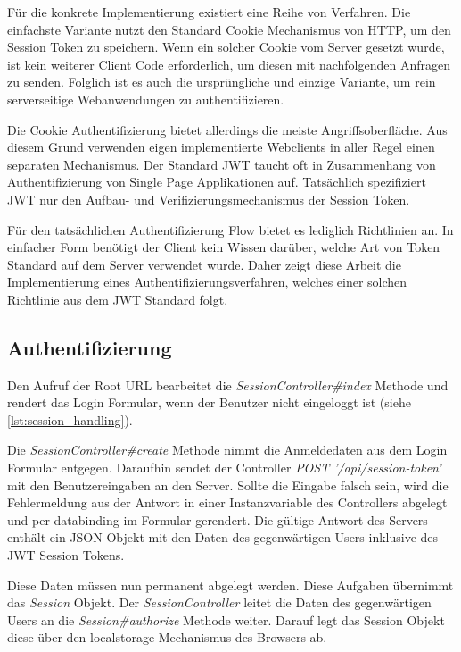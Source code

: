 Für die konkrete Implementierung existiert eine Reihe von Verfahren. Die einfachste Variante nutzt den Standard Cookie Mechanismus von HTTP, um den Session Token zu speichern. Wenn ein solcher Cookie vom Server gesetzt wurde, ist kein weiterer Client Code erforderlich, um diesen mit nachfolgenden Anfragen zu senden. Folglich ist es auch die ursprüngliche und einzige Variante, um rein serverseitige Webanwendungen zu authentifizieren.

Die Cookie Authentifizierung bietet allerdings die meiste Angriffsoberfläche. Aus diesem Grund verwenden eigen implementierte Webclients in aller Regel einen separaten Mechanismus. Der Standard JWT taucht oft in Zusammenhang von Authentifizierung von Single Page Applikationen auf. Tatsächlich spezifiziert JWT nur den Aufbau- und Verifizierungsmechanismus der Session Token. 

Für den tatsächlichen Authentifizierung Flow bietet es lediglich Richtlinien an. In einfacher Form benötigt der Client kein Wissen darüber, welche Art von Token Standard auf dem Server verwendet wurde. Daher zeigt diese Arbeit die Implementierung eines Authentifizierungsverfahren, welches einer solchen Richtlinie aus dem JWT Standard folgt. 

\subsection{Authentifizierung}

Den Aufruf der Root URL bearbeitet die \textit{SessionController\#index} Methode und rendert das Login Formular, wenn der Benutzer nicht eingeloggt ist (siehe \ref{lst:session_handling}).

Die \textit{SessionController\#create} Methode nimmt die Anmeldedaten aus dem Login Formular entgegen. Daraufhin sendet der Controller \textit{POST '/api/session-token'} mit den Benutzereingaben an den Server. Sollte die Eingabe falsch sein, wird die Fehlermeldung aus der Antwort in einer Instanzvariable des Controllers abgelegt und per \gls{databinding} im Formular gerendert. Die gültige Antwort des Servers enthält ein JSON Objekt mit den Daten des gegenwärtigen Users inklusive des JWT Session Tokens. 

Diese Daten müssen nun permanent abgelegt werden. Diese Aufgaben übernimmt das \textit{Session} Objekt. Der \textit{SessionController} leitet die Daten des gegenwärtigen Users an die \textit{Session\#authorize} Methode weiter. Darauf legt das Session Objekt diese über den \gls{localstorage} Mechanismus des Browsers ab. 

